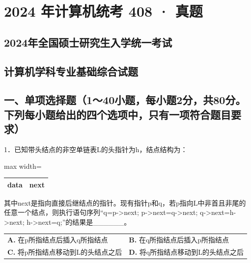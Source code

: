 \documentclass[UTF8,11pt]{ctexart}
\begin{document}
\section*{2024 年计算机统考 408 · 真题}
\subsection*{2024年全国硕士研究生入学统一考试}

\subsection*{计算机学科专业基础综合试题}

\subsection*{一、单项选择题（1～40小题，每小题2分，共80分。下列每小题给出的四个选项中，只有一项符合题目要求）}

1．已知带头结点的非空单链表L的头指针为h，结点结构为：


\begin{center}\begin{adjustbox}{max width=\linewidth}\begin{tabular}{|>{\raggedright\arraybackslash}p{\dimexpr(\linewidth-4\tabcolsep-3\arrayrulewidth)/2\relax}|>{\raggedright\arraybackslash}p{\dimexpr(\linewidth-4\tabcolsep-3\arrayrulewidth)/2\relax}|}\hline
data & next\\\hline\end{tabular}\end{adjustbox}\end{center}

其中next是指向直接后继结点的指针。现有指针p和q，若p指向L中非首且非尾的任意一个结点，则执行语句序列“q=p->next; p->next=q->next; q->next=h->next; h->next=q;”的结果是\_\_\_\_\_\_。


\begin{center}\begin{tabular}{>{\raggedright\arraybackslash}p{\dimexpr(\linewidth-4\tabcolsep)/2\relax}>{\raggedright\arraybackslash}p{\dimexpr(\linewidth-4\tabcolsep)/2\relax}}
\textbf{A.} 在p所指结点后插入q所指结点 & \textbf{B.} 在q所指结点后插入p所指结点\\[.35em]
\textbf{C.} 将p所指结点移动到L的头结点之后 & \textbf{D.} 将q所指结点移动到L的头结点之后\\[.35em]\end{tabular}\end{center}
\end{document}

